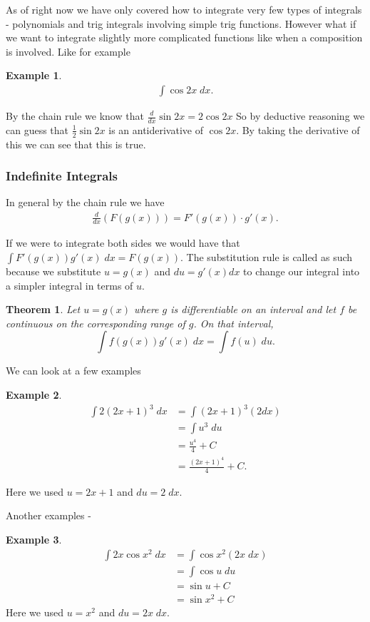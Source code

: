 \documentclass[12pt,reqno]{article}
\newtheorem{Theorem}{Theorem}
\theoremstyle{definition}
\newtheorem*{Example}{Example}
\begin{document}
As of right now we have only covered how to integrate very few types of integrals - polynomials and trig integrals involving simple trig functions. However what if we want to integrate slightly more complicated functions like when a composition is involved. Like for example 
\begin{Example}
	\begin{align*}
		\int \cos 2x \; dx. 
	\end{align*}

By the chain rule we know that $\frac{d}{dx} \sin 2x = 2 \cos 2x$ So by deductive reasoning we can guess that $\frac{1}{2} \sin 2x$ is an antiderivative of $\cos 2x$. By taking the derivative of this we can see that this is true. 
\end{Example}

\subsubsection{Indefinite Integrals}
In general by the chain rule we have \begin{align*}
	\frac{d}{dx} (F(g(x))) = F'(g(x)) \cdot g'(x).
\end{align*}

If we were to integrate both sides we would have that $\int F'(g(x))g'(x) \; dx = F(g(x))$. The substitution rule is called as such because we substitute $u = g(x)$ and $du = g'(x) dx$ to change our integral into a simpler integral in terms of $u$. 

\begin{Theorem}
	Let $u = g(x)$ where $g$ is differentiable on an interval and let $f$ be continuous on the corresponding range of $g$. On that interval, $$\int f(g(x)) g'(x) \; dx = \int f(u) \; du.$$
\end{Theorem}

We can look at a few examples 
\begin{Example}
	\begin{align*}
		\int 2 (2x + 1)^3 \;dx &= \int (2x + 1)^3 (2 dx) \\
							   &= \int u^3 \; du \\
							   &= \frac{u^4}{4} + C \\
							   &= \frac{(2x + 1)^4}{4} + C.
	\end{align*}

	Here we used $u = 2x + 1$ and $du = 2 \; dx$. 
\end{Example}

Another examples - 
\begin{Example}
	\begin{align*}
		\int 2x \cos x^2 \;dx &= \int \cos x^2 (2x \; dx) \\
							  &= \int \cos u \; du \\
							  &= \sin u + C \\
							  &= \sin x^2 + C
	\end{align*}
	Here we used $u = x^2$ and $du = 2x \; dx$. 
\end{Example}
\end{document}
